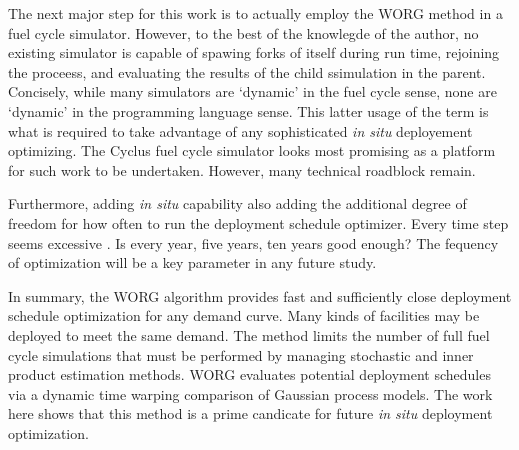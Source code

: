 The next major step for this work is to actually employ the WORG method in 
a fuel cycle simulator.  However, to the best of the knowlegde of the 
author, no existing simulator is capable of spawing forks of itself 
during run time, rejoining the proceess, and evaluating the results of the 
child ssimulation in the parent. Concisely, while many simulators are 
`dynamic' in the fuel cycle sense, none are `dynamic' in the programming
language sense. This latter usage of the term is what is required to 
take advantage of any sophisticated \emph{in situ} deployement optimizing.
The Cyclus fuel cycle simulator looks most promising as a platform
for such work to be undertaken. However, many technical roadblock remain.

Furthermore, adding \emph{in situ} capability also adding the additional 
degree of freedom for how often to run the deployment schedule optimizer.
Every time step seems excessive . Is every year, five years,
ten years good enough? The fequency of optimization will be a key 
parameter in any future study.

In summary, the WORG algorithm provides fast and sufficiently close 
deployment schedule optimization for any demand curve.  Many kinds of 
facilities may be deployed to meet the same demand.  The method 
limits the number of full fuel cycle simulations that must be performed by
managing stochastic and inner product estimation methods. WORG
evaluates potential deployment schedules via a dynamic time warping 
comparison of Gaussian process models. The work here shows that this 
method is a prime candicate for future \emph{in situ} deployment 
optimization. 


